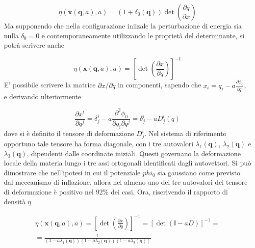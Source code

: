 \begin{equation}
    \eta(\bm{x}(\bm{q}, a), a) = (1 + \delta_0(\bm{q}))\det\left(\frac{\partial q}{\partial x}\right) 
\end{equation}
Ma supponendo che nella configurazione iniizale la perturbazione di energia sia nulla $\delta_0 = 0$
e contemporaneamente utilizzando le proprietà del determinante, si potrà scrivere anche

\begin{equation}
    \eta(\bm{x}(\bm{q}, a), a) = \left[\det\left(\frac{\partial x}{\partial q}\right)\right]^{-1}
\end{equation}
E' possibile scrivere la matrice $\partial x$/$\partial q$ in componenti, sapendo che $x_i = q_i - a \frac{\partial\phi_0}{\partial q^i}$, 
e derivando ulteriormente 

\begin{equation}
    \frac{\partial x^i}{\partial q^j} = \delta^i_j - a \frac{\partial^2 \phi_0}{\partial q_i \partial q^j} = 
    \delta^i_j - a D^i_j(q)
\end{equation}
dove si è definito il tensore di deformazione $D^i_j$. Nel sistema di riferimento opportuno tale tensore ha forma
diagonale, con i tre autovalori $\lambda_1(\bm{q})$, $\lambda_2(\bm{q})$ e $\lambda_3(\bm{q})$, dipendenti dalle
coordinate iniziali. Questi governano la deformazione locale della materia lungo i tre assi ortogonali identificati
dagli autovettori. Si può dimostrare che nell'ipotesi in cui il potenziale $phi_0$ sia gaussiano come previsto
dal meccanismo di inflazione, allora nel almeno uno dei tre autovalori del tensore di deformazione è positivo 
nel 92$\%$ dei casi.
Ora, riscrivendo il rapporto di densità $\eta$

\begin{multline}
    \eta(\bm{x}(\bm{q}, a), a) = \left[\det\left(\frac{\partial x}{\partial q}\right)\right]^{-1} = \left[\det\left( \mathbb{I}- a D \right)\right]^{-1} = \\
    = \frac{1}{(1-a\lambda_1(\bm{q}))(1-a\lambda_2(\bm{q}))(1-a\lambda_3(\bm{q}))}
\end{multline}

